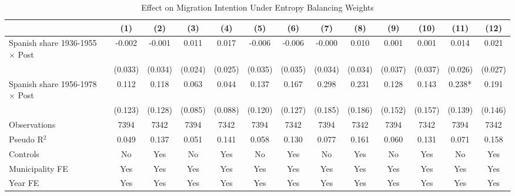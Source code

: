 \begin{table}[!h]
\centering
\renewcommand{\arraystretch}{1.25}
\setlength{\tabcolsep}{3pt}
\caption{Effect on Migration Intention Under Entropy Balancing Weights}
\begin{tabular}{lcccccccccccc}
\hline
 & (1) & (2) & (3) & (4) & (5) & (6) & (7) & (8) & (9) & (10) & (11) & (12) \\
\hline
Spanish share 1936-1955 $\times$ Post & -0.002 & -0.001 & 0.011 & 0.017 & -0.006 & -0.006 & -0.000 & 0.010 & 0.001 & 0.001 & 0.014 & 0.021 \\
 & (0.033) & (0.034) & (0.024) & (0.025) & (0.035) & (0.035) & (0.034) & (0.034) & (0.037) & (0.037) & (0.026) & (0.027) \\
Spanish share 1956-1978 $\times$ Post & 0.112 & 0.118 & 0.063 & 0.044 & 0.137 & 0.167 & 0.298 & 0.231 & 0.128 & 0.143 & 0.238* & 0.191 \\
 & (0.123) & (0.128) & (0.085) & (0.088) & (0.120) & (0.127) & (0.185) & (0.186) & (0.152) & (0.157) & (0.139) & (0.146) \\
\addlinespace
Observations & 7394 & 7342 & 7394 & 7342 & 7394 & 7342 & 7394 & 7342 & 7394 & 7342 & 7394 & 7342 \\
Pseudo R$^2$ & 0.049 & 0.137 & 0.051 & 0.141 & 0.058 & 0.130 & 0.077 & 0.161 & 0.060 & 0.131 & 0.071 & 0.158 \\
Controls & No & Yes & No & Yes & No & Yes & No & Yes & No & Yes & No & Yes \\
Municipality FE & Yes & Yes & Yes & Yes & Yes & Yes & Yes & Yes & Yes & Yes & Yes & Yes \\
Year FE & Yes & Yes & Yes & Yes & Yes & Yes & Yes & Yes & Yes & Yes & Yes & Yes \\
\hline
\end{tabular}
\vspace{0.4em}
\captionsetup{justification=justified, singlelinecheck=false}

\end{table}
